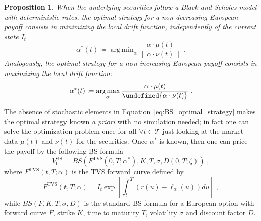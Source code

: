 \documentclass[11pt]{article}
\newtheorem{proposition}[theorem]{Proposition}
\let\norm\undefined %
\DeclarePairedDelimiter\norm{\lVert}{\rVert}
\DeclareMathOperator*{\argmax}{arg\,max}
\DeclareMathOperator*{\argmin}{arg\,min}
\begin{document}
\begin{proposition}
When the underlying securities follow a Black and Scholes model with deterministic rates, the optimal strategy for a non-decreasing European payoff consists in minimizing the local drift function, independently of the current state $I_t$
\begin{equation}
    \alpha^*(t) \coloneqq \argmin_\alpha \frac{\alpha \cdot \mu(t)}{\|\alpha \cdot \nu(t) \|} \; .
\label{eq:BS_optimal_strategy}
\end{equation}
Analogously, the optimal strategy for a non-increasing European payoff consists in maximizing the local drift function:
\begin{equation}
    \alpha^*(t) \coloneqq \argmax_\alpha \frac{\alpha \cdot \mu(t)}{\norm{\alpha \cdot \nu(t)}} \; .
\label{eq:BS_optimal_strategy_put}
\end{equation}
\end{proposition}
The absence of stochastic elements in Equation~\eqref{eq:BS_optimal_strategy} makes the optimal strategy known \textit{a priori} with no simulation needed; in fact one can solve the optimization problem once for all $\forall t \in \mathcal{T}$ just looking at the market data $\mu(t)$ and $\nu(t)$ for the securities. Once $\alpha^*$ is known, then one can price the payoff by the following BS formula
\begin{equation}
	V_0^{\text{BS}} = BS(F^{\text{TVS}}(0,T;\alpha^*), K, T, \bar{\sigma}, D(0,T;\zeta)) \; ,
\label{eq:bs_closed_solution}\end{equation}
where $F^{\text{TVS}}(t,T;\alpha)$ is the TVS forward curve defined by
\begin{equation}
	F^{\text{TVS}}(t,T;\alpha) = I_t \exp\left[\int_t^T\left(r(u)-\ell_{\alpha} \left(u\right)\right)du\right] \; ,
\label{eq:tvs_forward}\end{equation}
while $BS(F,K,T,\sigma,D)$ is the standard BS formula for a European option with forward curve $F$, strike $K$, time to maturity $T$, volatility $\sigma$ and discount factor $D$. 
\end{document}
